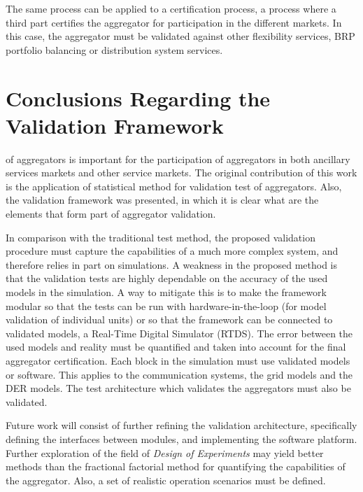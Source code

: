 The same process can be applied to a certification process, \ie a process where a third part certifies the aggregator for participation in the different markets. In this case, the aggregator must be validated against other flexibility services, \ie BRP portfolio balancing or distribution system services.

\section{Conclusions Regarding the Validation Framework}
 of aggregators is important for the participation of aggregators in both ancillary services markets and other service markets. The original contribution of this work is the application of statistical method for validation test of aggregators. Also, the validation framework was presented, in which it is clear what are the elements that form part of aggregator validation.

In comparison with the traditional test method, the proposed validation procedure must capture the capabilities of a much more complex system, and therefore relies in part on simulations. A weakness in the proposed method is that the validation tests are highly dependable on the accuracy of the used models in the simulation. A way to mitigate this is to make the framework modular so that the tests can be run with hardware-in-the-loop (for model validation of individual units) or so that the framework can be connected to validated models, \eg a Real-Time Digital Simulator (RTDS). The error between the used models and reality must be quantified and taken into account for the final aggregator certification. Each block in the simulation must use validated models or software. This applies to the communication systems, the grid models and the DER models. The test architecture which validates the aggregators must also be validated.

Future work will consist of further refining the validation architecture, specifically defining the interfaces between modules, and implementing the software platform. Further exploration of the field of \emph{Design of Experiments} may yield better methods than the fractional factorial method for quantifying the capabilities of the aggregator. Also, a set of realistic operation scenarios must be defined.
